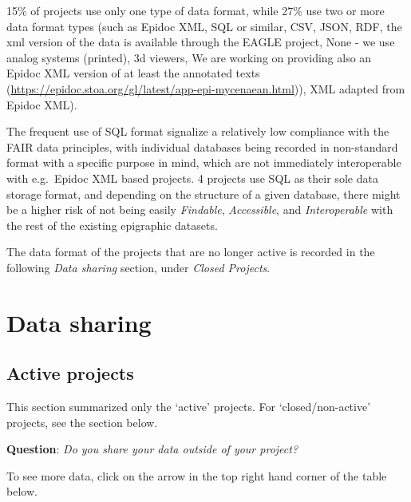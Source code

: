 \documentclass[
  12pt,
]{scrreprt}
\begin{document}
15\% of projects use only one type of data format, while 27\% use two or
more data format types (such as Epidoc XML, SQL or similar, CSV, JSON,
RDF, the xml version of the data is available through the EAGLE project,
None - we use analog systems (printed), 3d viewers, We are working on
providing also an Epidoc XML version of at least the annotated texts
(\url{https://epidoc.stoa.org/gl/latest/app-epi-mycenaean.html})), XML
adapted from Epidoc XML).

The frequent use of SQL format signalize a relatively low compliance
with the FAIR data principles, with individual databases being recorded
in non-standard format with a specific purpose in mind, which are not
immediately interoperable with e.g.~Epidoc XML based projects. 4
projects use SQL as their sole data storage format, and depending on the
structure of a given database, there might be a higher risk of not being
easily \emph{Findable}, \emph{Accessible}, and \emph{Interoperable} with
the rest of the existing epigraphic datasets.

The data format of the projects that are no longer active is recorded in
the following \emph{Data sharing} section, under \emph{Closed Projects}.

\hypertarget{data-sharing-1}{%
\section{Data sharing}\label{data-sharing-1}}

\hypertarget{active-projects}{%
\subsection{Active projects}\label{active-projects}}

This section summarized only the `active' projects. For
`closed/non-active' projects, see the section below.

\textbf{Question}: \emph{Do you share your data outside of your
project?}

To see more data, click on the arrow in the top right hand corner of the
table below.
\end{document}
